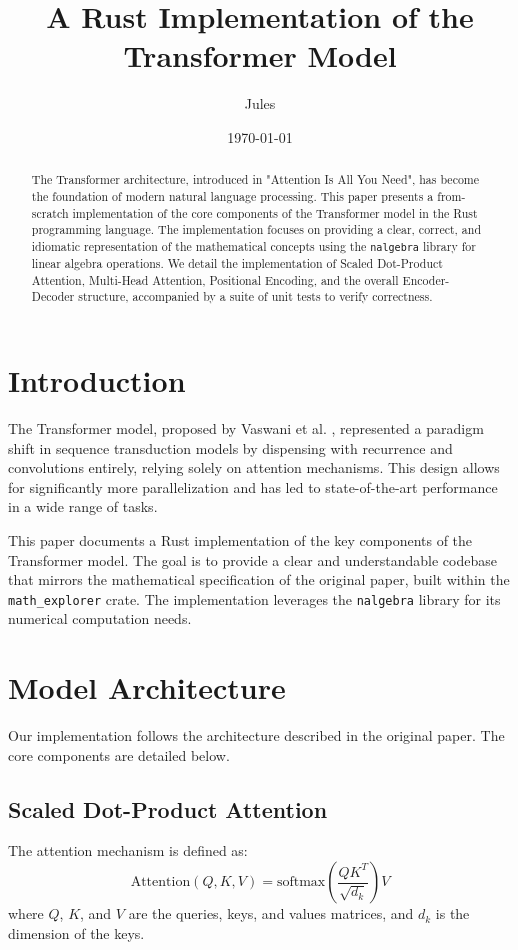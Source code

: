 \documentclass{article}
\title{A Rust Implementation of the Transformer Model}
\author{Jules}
\date{\today}
\begin{document}
\maketitle

\begin{abstract}
The Transformer architecture, introduced in "Attention Is All You Need", has become the foundation of modern natural language processing. This paper presents a from-scratch implementation of the core components of the Transformer model in the Rust programming language. The implementation focuses on providing a clear, correct, and idiomatic representation of the mathematical concepts using the \texttt{nalgebra} library for linear algebra operations. We detail the implementation of Scaled Dot-Product Attention, Multi-Head Attention, Positional Encoding, and the overall Encoder-Decoder structure, accompanied by a suite of unit tests to verify correctness.
\end{abstract}

\section{Introduction}
The Transformer model, proposed by Vaswani et al. \cite{vaswani2017attention}, represented a paradigm shift in sequence transduction models by dispensing with recurrence and convolutions entirely, relying solely on attention mechanisms. This design allows for significantly more parallelization and has led to state-of-the-art performance in a wide range of tasks.

This paper documents a Rust implementation of the key components of the Transformer model. The goal is to provide a clear and understandable codebase that mirrors the mathematical specification of the original paper, built within the \texttt{math_explorer} crate. The implementation leverages the \texttt{nalgebra} library \cite{nalgebra} for its numerical computation needs.

\section{Model Architecture}
Our implementation follows the architecture described in the original paper. The core components are detailed below.

\subsection{Scaled Dot-Product Attention}
The attention mechanism is defined as:
\[ \text{Attention}(Q, K, V) = \text{softmax}\left(\frac{QK^T}{\sqrt{d_k}}\right)V \]
where $Q$, $K$, and $V$ are the queries, keys, and values matrices, and $d_k$ is the dimension of the keys.
\end{document}
